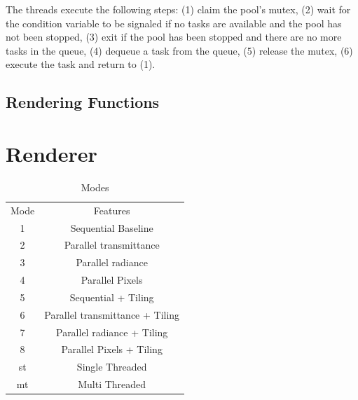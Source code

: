 \documentclass[a4paper, 11pt]{memoir}
\begin{document}
    The threads execute the following steps: (1) claim the pool's mutex, (2) wait for the condition variable to be signaled if no tasks are available and the pool
    has not been stopped, (3) exit if the pool has been stopped and there are no more tasks in the queue, (4) dequeue a task from the queue, (5) release the mutex, (6) execute
    the task and return to (1).


    \subsection{Rendering Functions}
    \label{sec:rendering_functions}
    \section{Renderer}
    \label{sec:renderer}
    \begin{table}[H]
        \centering
        \begin{tabular}{|c|c|}
            \hline
            Mode & Features\\
            1    & Sequential Baseline\\
            2    & Parallel \gls{transmittance}\\
            3    & Parallel \gls{radiance}\\
            4    & Parallel Pixels\\
            5    & Sequential + Tiling\\
            6    & Parallel \gls{transmittance} + Tiling\\
            7    & Parallel \gls{radiance} + Tiling\\
            8    & Parallel Pixels + Tiling\\
            st   & Single Threaded\\
            mt   & Multi Threaded\\
            \hline
        \end{tabular}
        \caption{Modes}
        \label{tab:exec_modes}
    \end{table}
    
\end{document}
